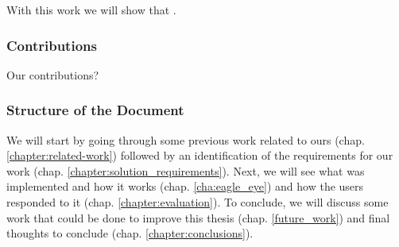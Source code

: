 With this work we will show that .




\subsubsection{Contributions} %
\label{sec:contributions}

Our contributions?



\subsubsection{Structure of the Document} %
\label{ssub:structure_of_the_document}

We will start by going through some previous work related to ours (chap. \ref{chapter:related-work}) followed by an identification of the requirements for our work (chap. \ref{chapter:solution_requirements}). Next, we will see what was implemented and how it works (chap. \ref{cha:eagle_eye}) and how the users responded to it (chap. \ref{chapter:evaluation}). To conclude, we will discuss some work that could be done to improve this thesis (chap. \ref{future_work}) and final thoughts to conclude (chap. \ref{chapter:conclusions}).


